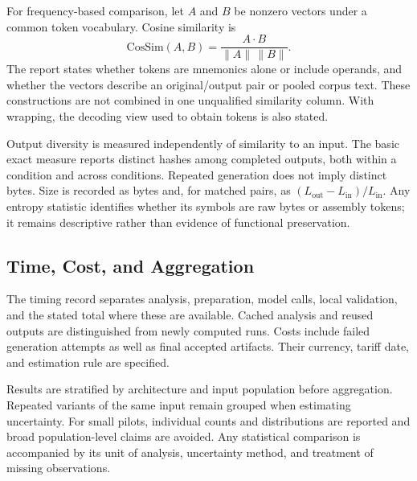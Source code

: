 For frequency-based comparison, let $A$ and $B$ be nonzero vectors
under a common token vocabulary. Cosine similarity is
\begin{equation}
\mathrm{CosSim}(A,B)=\frac{A\cdot B}{\|A\|\,\|B\|}.
\end{equation}
The report states whether tokens are mnemonics alone or include
operands, and whether the vectors describe an original/output pair
or pooled corpus text. These constructions are not combined in one
unqualified similarity column. With wrapping, the decoding view used
to obtain tokens is also stated.

Output diversity is measured independently of similarity to an input.
The basic exact measure reports distinct hashes among completed
outputs, both within a condition and across conditions. Repeated
generation does not imply distinct bytes. Size is recorded as bytes
and, for matched pairs, as $(L_{\mathrm{out}}-L_{\mathrm{in}})/L_{\mathrm{in}}$.
Any entropy statistic identifies whether its symbols are raw bytes or
assembly tokens; it remains descriptive rather than evidence of
functional preservation.

\subsection{Time, Cost, and Aggregation}
The timing record separates analysis, preparation, model calls, local
validation, and the stated total where these are available. Cached
analysis and reused outputs are distinguished from newly computed
runs. Costs include failed generation attempts as well as final
accepted artifacts. Their currency, tariff date, and estimation rule
are specified.

Results are stratified by architecture and input population before
aggregation. Repeated variants of the same input remain grouped when
estimating uncertainty. For small pilots, individual counts and
distributions are reported and broad population-level claims are
avoided. Any statistical comparison is accompanied by its unit of
analysis, uncertainty method, and treatment of missing observations.
